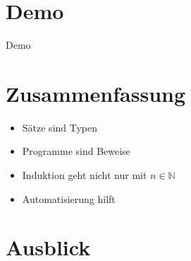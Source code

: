 \documentclass[aspectratio=169]{beamer}
\begin{document}
\section{Demo}
\begin{frame}
  \begin{center}
    \huge{Demo}
  \end{center}
\end{frame}
\section{Zusammenfassung}
\begin{frame}
    \begin{itemize}
  \item Sätze sind Typen
  \item Programme sind Beweise
  \item Induktion geht nicht nur mit $n\in\mathbb{N}$
  \item Automatisierung hilft
  \end{itemize}
\end{frame}
\section{Ausblick}
\begin{frame}
\end{frame} %
\end{document}
